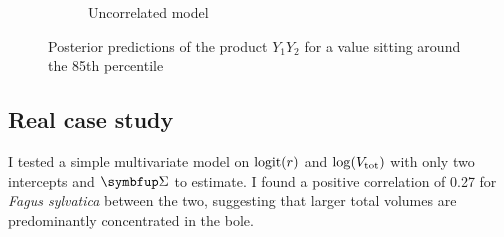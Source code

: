 \begin{figure}[htb]
\begin{subfigure}{0.4\textwidth}
		\caption{Uncorrelated model}
		\label{fig:cdiagram}
	\end{subfigure}
	\caption{Posterior predictions of the product \( Y_1 Y_2 \) for a value sitting around the 85\textup{th} percentile}
	\label{fig::res-15}
\end{figure}

\subsection{Real case study}

I tested a simple multivariate model on \( \operatorname{logit}(r) \) and \( \log(V_{\text{tot}}) \) with only two intercepts and \( \Sigmabf \) to estimate. I found a positive correlation of 0.27 for \textit{Fagus sylvatica} between the two, suggesting that larger total volumes are predominantly concentrated in the bole.
